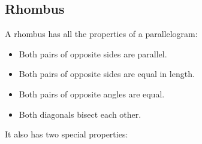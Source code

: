 \subsection{Rhombus}
\par

A rhombus has all the properties of a parallelogram:
\vspace*{-1em}
\begin{itemize}[noitemsep]
\item Both pairs of opposite sides are parallel.
\item Both pairs of opposite sides are equal in length.
\item Both pairs of opposite angles are equal.
\item Both diagonals bisect each other.
\end{itemize}

It also has two special properties:

